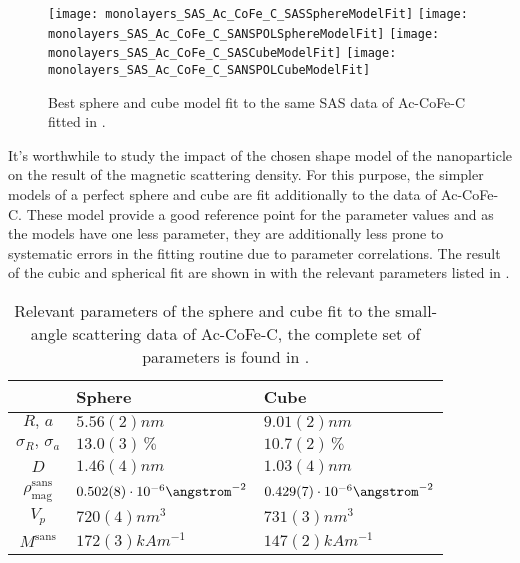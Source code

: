 \documentclass[\main/dresen_thesis.tex]{subfiles}
\begin{document}
    \begin{figure}[tb]
      \centering
      \texttt{[image: monolayers\_SAS\_Ac\_CoFe\_C\_SASSphereModelFit]}
      \texttt{[image: monolayers\_SAS\_Ac\_CoFe\_C\_SANSPOLSphereModelFit]}
      \texttt{[image: monolayers\_SAS\_Ac\_CoFe\_C\_SASCubeModelFit]}
      \texttt{[image: monolayers\_SAS\_Ac\_CoFe\_C\_SANSPOLCubeModelFit]}
      \caption{\label{fig:monolayers:nanoparticle:sas:SphereCubeFit}Best sphere and cube model fit to the same SAS data of Ac-CoFe-C fitted in .}
    \end{figure}

    It's worthwhile to study the impact of the chosen shape model of the nanoparticle on the result of the magnetic scattering density.
    For this purpose, the simpler models of a perfect sphere and cube are fit additionally to the data of Ac-CoFe-C.
    These model provide a good reference point for the parameter values and as the models have one less parameter, they are additionally less prone to systematic errors in the fitting routine due to parameter correlations.
    The result of the cubic and spherical fit are shown in  with the relevant parameters listed in .

    \begin{table}[ht]
      \centering
      \caption{\label{tab:monolayers:nanoparticle:sasSphereCubeFit}Relevant parameters of the sphere and cube fit to the small-angle scattering data of Ac-CoFe-C, the complete set of parameters is found in .}
      \begin{tabular}{ c | l | l }
          & Sphere & Cube \\
        \hline
        $R, \, a$
          & $5.56(2) \unit{nm}$
          & $9.01(2) \unit{nm}$\\
        $\sigma_R, \, \sigma_a$
          & $13.0(3) \,\%$
          & $10.7(2) \,\%$\\
        $D$
          & $1.46(4) \unit{nm}$
          & $1.03(4) \unit{nm}$\\
        $\rho_\mathrm{mag}^\mathrm{sans}$
          & $0.502(8) \cdot 10^{-6} \angstrom^{-2}$
          & $0.429(7) \cdot 10^{-6} \angstrom^{-2}$\\
        \hline
        $V_p$
          & $720(4) \unit{nm^{3}}$
          & $731(3) \unit{nm^{3}}$\\
        $M^\mathrm{sans}$
          & $172(3) \unit{kAm^{-1}}$
          & $147(2) \unit{kAm^{-1}}$\\
        \hline
      \end{tabular}
    \end{table}
\end{document}
